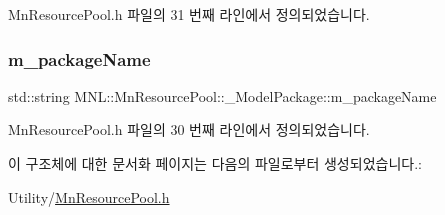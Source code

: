 Mn\+Resource\+Pool.\+h 파일의 31 번째 라인에서 정의되었습니다.

\mbox{\label{struct_m_n_l_1_1_mn_resource_pool_1_1___model_package_ae206cfd79820ffa3e4d30169b977a068}} 
\subsubsection{\texorpdfstring{m\+\_\+package\+Name}{m\_packageName}}
{\footnotesize\ttfamily std\+::string M\+N\+L\+::\+Mn\+Resource\+Pool\+::\+\_\+\+Model\+Package\+::m\+\_\+package\+Name}



Mn\+Resource\+Pool.\+h 파일의 30 번째 라인에서 정의되었습니다.



이 구조체에 대한 문서화 페이지는 다음의 파일로부터 생성되었습니다.\+:\begin{DoxyCompactItemize}
\item 
Utility/\hyperlink{_mn_resource_pool_8h}{Mn\+Resource\+Pool.\+h}\end{DoxyCompactItemize}
